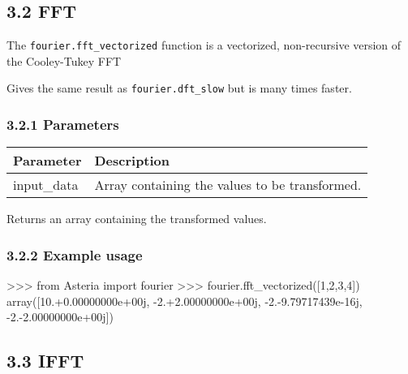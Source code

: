 \documentclass[]{article}
\newenvironment{Shaded}{}{}
\newcommand{\DecValTok}[1]{\textcolor[rgb]{0.25,0.63,0.44}{#1}}
\newcommand{\FloatTok}[1]{\textcolor[rgb]{0.25,0.63,0.44}{#1}}
\newcommand{\ImportTok}[1]{#1}
\newcommand{\OperatorTok}[1]{\textcolor[rgb]{0.40,0.40,0.40}{#1}}
\newcommand{\NormalTok}[1]{#1}
\begin{document}
\subsection{3.2 FFT}\label{fft}

The \texttt{fourier.fft\_vectorized} function is a vectorized,
non-recursive version of the Cooley-Tukey FFT

Gives the same result as \texttt{fourier.dft\_slow} but is many times
faster.

\subsubsection{3.2.1 Parameters}\label{parameters-1}

\begin{longtable}[]{@{}ll@{}}
\toprule
Parameter & Description\tabularnewline
\midrule
\endhead
input\_data & Array containing the values to be
transformed.\tabularnewline
\bottomrule
\end{longtable}

Returns an array containing the transformed values.

\subsubsection{3.2.2 Example usage}\label{example-usage-1}

\begin{Shaded}
\begin{Highlighting}[]
\OperatorTok{>>>} \ImportTok{from}\NormalTok{ Asteria }\ImportTok{import}\NormalTok{ fourier}
\OperatorTok{>>>}\NormalTok{ fourier.fft_vectorized([}\DecValTok{1}\NormalTok{,}\DecValTok{2}\NormalTok{,}\DecValTok{3}\NormalTok{,}\DecValTok{4}\NormalTok{])}
\NormalTok{array([}\DecValTok{10}\NormalTok{.}\OperatorTok{+}\FloatTok{0.}\NormalTok{00000000e}\OperatorTok{+}\NormalTok{00j, }\OperatorTok{-}\DecValTok{2}\NormalTok{.}\OperatorTok{+}\FloatTok{2.}\NormalTok{00000000e}\OperatorTok{+}\NormalTok{00j, }\OperatorTok{-}\DecValTok{2}\NormalTok{.}\OperatorTok{-}\FloatTok{9.}\NormalTok{79717439e}\OperatorTok{-}\NormalTok{16j, }\OperatorTok{-}\DecValTok{2}\NormalTok{.}\OperatorTok{-}\FloatTok{2.}\NormalTok{00000000e}\OperatorTok{+}\NormalTok{00j])}
\end{Highlighting}
\end{Shaded}

\subsection{3.3 IFFT}\label{ifft}
\end{document}
